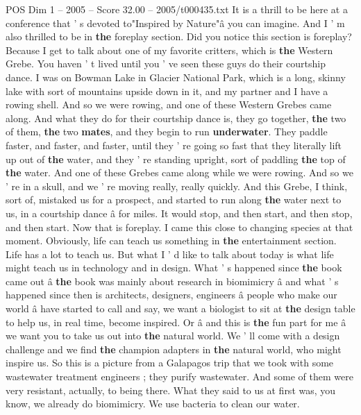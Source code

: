 \begin{textsample}{POS Dim 1 – 2005 – Score 32.00 – 2005/t000435.txt}  \label{ex:f1_pos_005}
It is a thrill to be here at a conference that ' s devoted to"Inspired by Nature"â you can imagine.
And I ' m also thrilled to be in \textbf{the} foreplay section.
Did you notice this section is foreplay?
Because I get to talk about one of my favorite critters, which is \textbf{the} Western Grebe.
You haven ' t lived until you ' ve seen these guys do their courtship dance.
I was on Bowman Lake in Glacier National Park, which is a long, skinny lake with sort of mountains upside down in it, and my partner and I have a rowing shell.
And so we were rowing, and one of these Western Grebes came along.
And what they do for their courtship dance is, they go together, \textbf{the} two of them, \textbf{the} two \textbf{mates}, and they begin to run \textbf{underwater}.
They paddle faster, and faster, and faster, until they ' re going so fast that they literally lift up out of \textbf{the} water, and they ' re standing upright, sort of paddling \textbf{the} top of \textbf{the} water.
And one of these Grebes came along while we were rowing.
And so we ' re in a skull, and we ' re moving really, really quickly.
And this Grebe, I think, sort of, mistaked us for a prospect, and started to run along \textbf{the} water next to us, in a courtship dance â for miles.
It would stop, and then start, and then stop, and then start.
Now that is foreplay.
I came this close to changing species at that moment.
Obviously, life can teach us something in \textbf{the} entertainment section.
Life has a lot to teach us.
But what I ' d like to talk about today is what life might teach us in technology and in design.
What ' s happened since \textbf{the} book came out â \textbf{the} book was mainly about research in biomimicry â and what ' s happened since then is architects, designers, engineers â people who make our world â have started to call and say, we want a biologist to sit at \textbf{the} design table to help us, in real time, become inspired.
Or â and this is \textbf{the} fun part for me â we want you to take us out into \textbf{the} natural world.
We ' ll come with a design challenge and we find \textbf{the} champion adapters in \textbf{the} natural world, who might inspire us.
So this is a picture from a Galapagos trip that we took with some wastewater treatment engineers ; they purify wastewater.
And some of them were very resistant, actually, to being there.
What they said to us at first was, you know, we already do biomimicry.
We use bacteria to clean our water.

\end{textsample}
